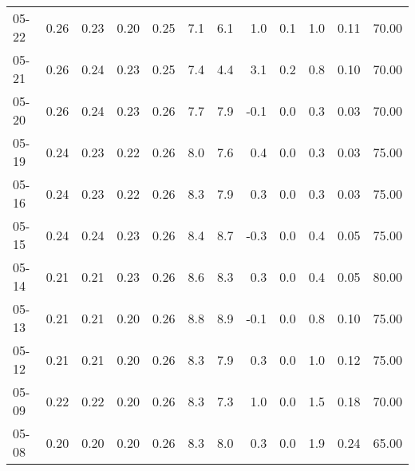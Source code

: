 \begin{threeparttable}
{\begin{tabular}{lrrrrrrrrrrr}
  05-22 &          0.26 &          0.23 &          0.20 &        0.25 &                 7.1 &                 6.1 &        1.0 &                 0.1 &              1.0 &            0.11 &                  70.00 \\
  05-21 &          0.26 &          0.24 &          0.23 &        0.25 &                 7.4 &                 4.4 &        3.1 &                 0.2 &              0.8 &            0.10 &                  70.00 \\
  05-20 &          0.26 &          0.24 &          0.23 &        0.26 &                 7.7 &                 7.9 &       -0.1 &                 0.0 &              0.3 &            0.03 &                  70.00 \\
  05-19 &          0.24 &          0.23 &          0.22 &        0.26 &                 8.0 &                 7.6 &        0.4 &                 0.0 &              0.3 &            0.03 &                  75.00 \\
  05-16 &          0.24 &          0.23 &          0.22 &        0.26 &                 8.3 &                 7.9 &        0.3 &                 0.0 &              0.3 &            0.03 &                  75.00 \\
  05-15 &          0.24 &          0.24 &          0.23 &        0.26 &                 8.4 &                 8.7 &       -0.3 &                 0.0 &              0.4 &            0.05 &                  75.00 \\
  05-14 &          0.21 &          0.21 &          0.23 &        0.26 &                 8.6 &                 8.3 &        0.3 &                 0.0 &              0.4 &            0.05 &                  80.00 \\
  05-13 &          0.21 &          0.21 &          0.20 &        0.26 &                 8.8 &                 8.9 &       -0.1 &                 0.0 &              0.8 &            0.10 &                  75.00 \\
  05-12 &          0.21 &          0.21 &          0.20 &        0.26 &                 8.3 &                 7.9 &        0.3 &                 0.0 &              1.0 &            0.12 &                  75.00 \\
  05-09 &          0.22 &          0.22 &          0.20 &        0.26 &                 8.3 &                 7.3 &        1.0 &                 0.0 &              1.5 &            0.18 &                  70.00 \\
  05-08 &          0.20 &          0.20 &          0.20 &        0.26 &                 8.3 &                 8.0 &        0.3 &                 0.0 &              1.9 &            0.24 &                  65.00 \\

\end{tabular}}
\end{threeparttable}
